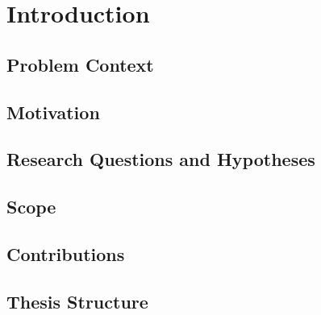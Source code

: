 %
%

\chapter{Introduction}

\section{Problem Context}

\section{Motivation}

\section{Research Questions and Hypotheses}

\section{Scope}

\section{Contributions}

\section{Thesis Structure}
